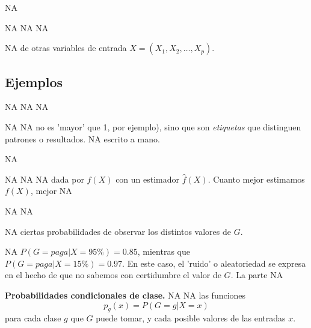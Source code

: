 \documentclass[nohyper]{tufte-handout}
\begin{document}


\maketitle



NA


NA
NA
NA

\begin{shaded}
NA
de otras variables de entrada $X= (X_1, X_2, \ldots, X_p)$. 
\end{shaded}

\subsection{Ejemplos}
NA
NA
NA

NA
NA
no es 'mayor' que 1, por ejemplo), sino que son {\em etiquetas} que distinguen patrones o resultados.
NA
escrito a mano.

NA

NA
NA
NA
dada por $f(X)$ con un estimador $\hat{f}(X)$. Cuanto mejor estimamos $f(X)$, mejor 
NA

NA
NA

NA
ciertas probabilidades de observar los distintos valores de $G$.

NA
$P(G=paga | X=95\%)=0.85$, mientras que $P(G=paga| X=15\% )=0.97$. En este caso, el 'ruido' o aleatoriedad se expresa en el hecho de que no sabemos con certidumbre el valor de $G$. La parte
NA

\begin{shaded}
{\bf Probabilidades condicionales de clase. }
NA
NA
las funciones
$$p_g(x) = P(G=g|X=x)$$ 
para cada clase $g$ que $G$ puede tomar, y cada posible valores de las entradas $x$.
\end{shaded}
\end{document}
